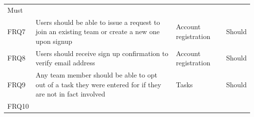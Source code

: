 \documentclass[12pt]{report}
\begin{document}
\begin{longtable}[]{@{}llll@{}}
\begin{minipage}[t]{0.09\columnwidth}
Must\strut
\end{minipage}\tabularnewline
\begin{minipage}[t]{0.04\columnwidth}\raggedright\strut
FRQ7\strut
\end{minipage} & \begin{minipage}[t]{0.64\columnwidth}\raggedright\strut
Users should be able to issue a request to join an existing team or
create a new one upon signup\strut
\end{minipage} & \begin{minipage}[t]{0.12\columnwidth}\raggedright\strut
Account registration\strut
\end{minipage} & \begin{minipage}[t]{0.09\columnwidth}\raggedright\strut
Should\strut
\end{minipage}\tabularnewline
\begin{minipage}[t]{0.04\columnwidth}\raggedright\strut
FRQ8\strut
\end{minipage} & \begin{minipage}[t]{0.64\columnwidth}\raggedright\strut
Users should receive sign up confirmation to verify email address\strut
\end{minipage} & \begin{minipage}[t]{0.12\columnwidth}\raggedright\strut
Account registration\strut
\end{minipage} & \begin{minipage}[t]{0.09\columnwidth}\raggedright\strut
Should\strut
\end{minipage}\tabularnewline
\begin{minipage}[t]{0.04\columnwidth}\raggedright\strut
FRQ9\strut
\end{minipage} & \begin{minipage}[t]{0.64\columnwidth}\raggedright\strut
Any team member should be able to opt out of a task they were entered
for if they are not in fact involved\strut
\end{minipage} & \begin{minipage}[t]{0.12\columnwidth}\raggedright\strut
Tasks\strut
\end{minipage} & \begin{minipage}[t]{0.09\columnwidth}\raggedright\strut
Should\strut
\end{minipage}\tabularnewline
\begin{minipage}[t]{0.04\columnwidth}\raggedright\strut
FRQ10\strut
\end{minipage} & \begin{minipage}[t]{0.64\columnwidth}\raggedright\strut

\end{minipage}
\end{longtable}
\end{document}
